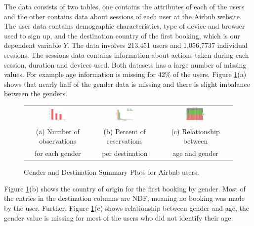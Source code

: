 \documentclass[12pt]{article}
\begin{document}
The data consists of two tables, one contains the attributes of each of the users and the other contains data about sessions of each user at the Airbnb website. The user data contains demographic characteristics, type of device and browser used to sign up, and the destination country of the first booking, which is our dependent variable $Y$. The data involves 213,451 users  and 1,056,7737 individual sessions. The sessions data contains  information about actions taken during each session, duration and devices used. Both datasets has a large number of missing values. For example age information is missing for 42\% of the users. Figure \ref{fig:airbnb_gender}(a) shows that nearly half of the gender data is missing and there is slight imbalance between the genders. 

\begin{figure}[H]
\begin{tabular}{ccc}
	\includegraphics[width=0.3\textwidth]{gender} & \includegraphics[width=0.3\textwidth]{gender_country} & \includegraphics[width=0.3\textwidth]{age_gender.png}\\
	(a) Number of observations & (b) Percent of reservations & (c) Relationship between \\
	for each gender & per destination & age and gender
\end{tabular}
\caption{Gender and Destination Summary Plots for Airbnb users.}
\label{fig:airbnb_gender}
\end{figure}
Figure \ref{fig:airbnb_gender}(b) shows the country of origin for the first booking by gender. Most of the entries in the destination columns are NDF, meaning no booking was made by the user. Further, Figure \ref{fig:airbnb_gender}(c) shows relationship between gender and age, the gender value is missing for most of the users who did not identify their age. 
\end{document}
